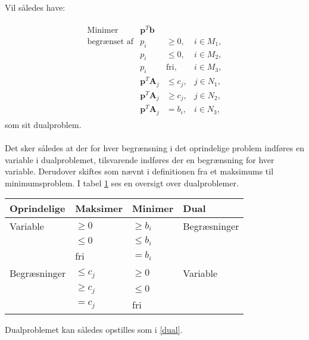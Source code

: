 Vil således have:


\begin{align*}
\begin{array}{lrll}
\text{Minimer}		&\textbf{p}^T\textbf{b}	&			&\\
\text{begrænset af}	&p_i					&\geq 0,	&i \in M_1,\\
					&p_i					&\leq 0,	&i \in M_2,\\
					&p_i					&\text{fri},	&i \in M_3,\\
					&\textbf{p}^T\textbf{A}_j	&\leq c_j,	&j \in N_1,\\
					&\textbf{p}^T\textbf{A}_j	&\geq c_j,	&j \in N_2,\\
					&\textbf{p}^T\textbf{A}_j	& = b_i,	&i \in N_3,
\end{array}
\end{align*}
%
som sit dualproblem.
\\\\
%
Det sker således at der for hver begrænsning i det oprindelige problem indføres en variable i dualproblemet, tilsvarende indføres der en begrænsning for hver variable. 
Derudover skiftes som nævnt i definitionen fra et maksimums til minimumsproblem.
I tabel \ref{julieerfantalastiska} ses en oversigt over dualproblemer.\\
%
\begin{table}[H]
\begin{center}
\begin{tabular}{llll}
Oprindelige  & Maksimer   & Minimer    & Dual         \\
\hline
Variable     & $\geq 0$   & $\geq b_i$ & Begræsninger \\
             & $\leq 0$   & $\leq b_i$ &              \\
             & fri        & $=b_i$     &              \\
\hline
Begræsninger & $\leq c_j$ & $\geq 0$   & Variable     \\
             & $\geq c_j$ & $\leq 0$   &              \\
             & $=c_j$     & fri        &             
\end{tabular}
\end{center}
\label{julieerfantalastiska}
\end{table}
\noindent
%
Dualproblemet kan således opstilles som i \ref{dual}. \\
